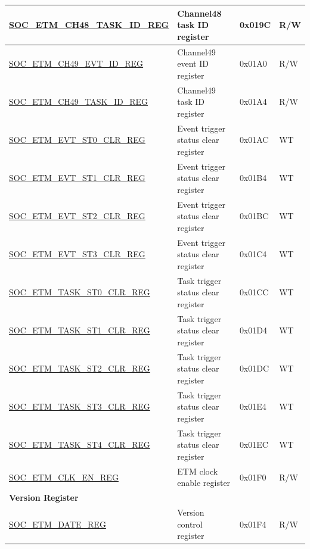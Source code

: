 \begin{longtable}{ | p{6cm} | p{6.2cm} | p{1.3cm} | p{2cm} | }
\hyperref[regdesc:SOCETMCHNTASKIDREG]{SOC\_ETM\_CH48\_TASK\_ID\_REG} & Channel48 task ID register & 0x019C & R/W \\ \hline
\hyperref[regdesc:SOCETMCHNEVTIDREG]{SOC\_ETM\_CH49\_EVT\_ID\_REG} & Channel49 event ID register & 0x01A0 & R/W \\ \hline
\hyperref[regdesc:SOCETMCHNTASKIDREG]{SOC\_ETM\_CH49\_TASK\_ID\_REG} & Channel49 task ID register & 0x01A4 & R/W \\ \hline
\hyperref[regdesc:SOCETMEVTST0CLRREG]{SOC\_ETM\_EVT\_ST0\_CLR\_REG} & Event trigger status clear register & 0x01AC & WT \\ \hline
\hyperref[regdesc:SOCETMEVTST1CLRREG]{SOC\_ETM\_EVT\_ST1\_CLR\_REG} & Event trigger status clear register & 0x01B4 & WT \\ \hline
\hyperref[regdesc:SOCETMEVTST2CLRREG]{SOC\_ETM\_EVT\_ST2\_CLR\_REG} & Event trigger status clear register & 0x01BC & WT \\ \hline
\hyperref[regdesc:SOCETMEVTST3CLRREG]{SOC\_ETM\_EVT\_ST3\_CLR\_REG} & Event trigger status clear register & 0x01C4 & WT \\ \hline
\hyperref[regdesc:SOCETMTASKST0CLRREG]{SOC\_ETM\_TASK\_ST0\_CLR\_REG} & Task trigger status clear register & 0x01CC & WT \\ \hline
\hyperref[regdesc:SOCETMTASKST1CLRREG]{SOC\_ETM\_TASK\_ST1\_CLR\_REG} & Task trigger status clear register & 0x01D4 & WT \\ \hline
\hyperref[regdesc:SOCETMTASKST2CLRREG]{SOC\_ETM\_TASK\_ST2\_CLR\_REG} & Task trigger status clear register & 0x01DC & WT \\ \hline
\hyperref[regdesc:SOCETMTASKST3CLRREG]{SOC\_ETM\_TASK\_ST3\_CLR\_REG} & Task trigger status clear register & 0x01E4 & WT \\ \hline
\hyperref[regdesc:SOCETMTASKST4CLRREG]{SOC\_ETM\_TASK\_ST4\_CLR\_REG} & Task trigger status clear register & 0x01EC & WT \\ \hline
\hyperref[regdesc:SOCETMCLKENREG]{SOC\_ETM\_CLK\_EN\_REG} & ETM clock enable register & 0x01F0 & R/W \\ \hline
\multicolumn{4}{|l|}{\textbf{Version Register}} \\ \hline
\hyperref[regdesc:SOCETMDATEREG]{SOC\_ETM\_DATE\_REG} & Version control register & 0x01F4 & R/W \\ \hline
\end{longtable}
